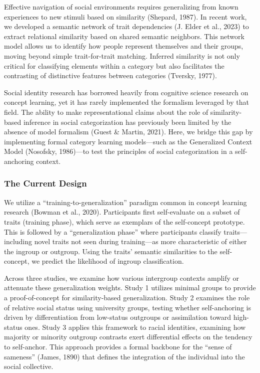 \documentclass[
  man,
  longtable,
  nolmodern,
  notxfonts,
  notimes,
  man]{apa7}
\begin{document}
Effective navigation of social environments requires generalizing from
known experiences to new stimuli based on similarity (Shepard, 1987). In
recent work, we developed a semantic network of trait dependencies (J.
Elder et al., 2023) to extract relational similarity based on shared
semantic neighbors. This network model allows us to identify how people
represent themselves and their groups, moving beyond simple
trait-for-trait matching. Inferred similarity is not only critical for
classifying elements within a category but also facilitates the
contrasting of distinctive features between categories (Tversky, 1977).

Social identity research has borrowed heavily from cognitive science
research on concept learning, yet it has rarely implemented the
formalism leveraged by that field. The ability to make representational
claims about the role of similarity-based inference in social
categorization has previously been limited by the absence of model
formalism (Guest \& Martin, 2021). Here, we bridge this gap by
implementing formal category learning models---such as the Generalized
Context Model (Nosofsky, 1986)---to test the principles of social
categorization in a self-anchoring context.

\subsubsection{The Current Design}\label{the-current-design}

We utilize a ``training-to-generalization'' paradigm common in concept
learning research (Bowman et al., 2020). Participants first
self-evaluate on a subset of traits (training phase), which serve as
exemplars of the self-concept prototype. This is followed by a
``generalization phase'' where participants classify traits---including
novel traits not seen during training---as more characteristic of either
the ingroup or outgroup. Using the traits' semantic similarities to the
self-concept, we predict the likelihood of ingroup classification.

Across three studies, we examine how various intergroup contexts amplify
or attenuate these generalization weights. Study 1 utilizes minimal
groups to provide a proof-of-concept for similarity-based
generalization. Study 2 examines the role of relative social status
using university groups, testing whether self-anchoring is driven by
differentiation from low-status outgroups or assimilation toward
high-status ones. Study 3 applies this framework to racial identities,
examining how majority or minority outgroup contrasts exert differential
effects on the tendency to self-anchor. This approach provides a formal
backbone for the ``sense of sameness'' (James, 1890) that defines the
integration of the individual into the social collective.
\end{document}
